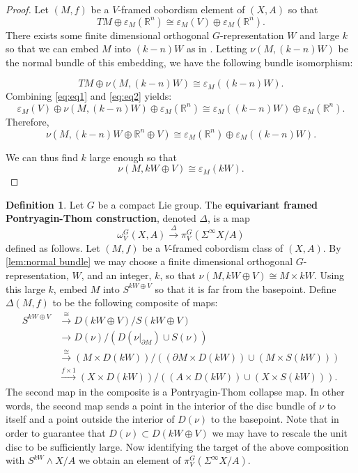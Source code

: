 \documentclass[11pt]{amsart}
\newcommand{\R}{\mathbb R}
\theoremstyle{plain}   %
\theoremstyle{definition}
\newtheorem{df}[thm]{Definition}
\theoremstyle{remark}
\numberwithin{equation}{section}
\begin{document}
\begin{proof}
Let $(M,f)$ be a $V$-framed cobordism element of $(X,A)$ so that
\begin{equation}\label{eq:eq1}
TM\oplus \varepsilon_M(\R^n)\cong \varepsilon_M(V)\oplus\varepsilon_M(\R^n).
\end{equation}
There exists some finite dimensional orthogonal $G$-representation $W$ and large $k$ so that we can embed $M$ into $(k-n)W$ as in \cite[Lemma 2.21]{gimm}. Letting $\nu(M,(k-n)W)$ be the normal bundle of this embedding, we have the following bundle isomorphism:

\begin{equation}\label{eq:eq2}
TM\oplus\nu(M,(k-n)W) \cong \varepsilon_M((k-n)W).
\end{equation}
Combining \cref{eq:eq1} and \cref{eq:eq2} yields:
\[
\varepsilon_M(V)\oplus\nu(M,(k-n)W)\oplus\varepsilon_M(\R^n) \cong \varepsilon_M((k-n)W)\oplus\varepsilon_M(\R^n).
\]
Therefore, 
\[
\nu(M,(k-n)W\oplus \R^n\oplus V)\cong\varepsilon_M(\R^n)\oplus\varepsilon_M((k-n)W).
\]

We can thus find $k$ large enough so that
\begin{equation}\label{eq:trivialize normal bundle}
\nu(M,kW\oplus V) \cong \varepsilon_M(kW).
\end{equation}
\end{proof}

\begin{df}\label{df:equivariant framed PT}
Let $G$ be a compact Lie group. The \textbf{equivariant framed Pontryagin-Thom construction}, denoted $\Delta$, is a map
\[
\omega_V^G(X,A) \xrightarrow{\Delta} \pi_V^G\left( \Sigma^\infty X/A \right)
\]
defined as follows. Let $(M,f)$ be a $V$-framed cobordism class of $(X,A)$. By \cref{lem:normal bundle} we may choose a finite dimensional orthogonal $G$-representation, $W$, and an integer, $k$, so that $\nu(M,kW\oplus V)\cong M\times kW$. Using this large $k$, embed $M$ into $S^{kW\oplus V}$ so that it is far from the basepoint. Define $\Delta(M,f)$ to be the following composite of maps:
\begin{align*}
S^{kW\oplus V} 
& \xrightarrow{\cong} D(kW\oplus V)/S(kW\oplus V)\\
& \xrightarrow{} D(\nu)/(D(\nu|_{\partial M})\cup S(\nu))\\
& \xrightarrow{\cong} (M\times D(kW))/((\partial M\times D(kW))\cup (M\times S(kW)))\\
& \xrightarrow{f\times 1} (X\times D(kW))/((A\times D(kW)) \cup (X\times S(kW))).
\end{align*}
The second map in the composite is a Pontryagin-Thom collapse map. In other words, the second map sends a point in the interior of the disc bundle of $\nu$ to itself and a point outside the interior of $D(\nu)$ to the basepoint. Note that in order to guarantee that $D(\nu)\subset D(kW\oplus V)$ we may have to rescale the unit disc to be sufficiently large. Now identifying the target of the above composition with $S^{kW}\wedge X/A$ we obtain an element of $\pi_V^G \left( \Sigma^\infty X/A\right)$. 
\end{df}
\end{document}
